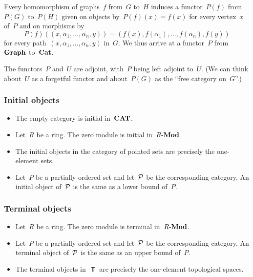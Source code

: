 \begin{itemize}
		Every homomorphism of graphs~$f$ from~$G$ to~$H$ induces a functor~$P(f)$ from~$P(G)$ to~$P(H)$ given on objects by~$P(f)(x) = f(x)$ for every vertex~$x$ of~$P$ and on morphisms by
		\[
			P(f)( (x, α_1, \dotsc, α_n, y) )
			=
			( f(x), f(α_1), \dotsc, f(α_n), f(y) )
		\]
		for every path~$(x, α_1, \dotsc, α_n, y)$ in~$G$.
		We thus arrive at a functor~$P$ from~$\mathbf{Graph}$ to~$\mathbf{Cat}$.

		The functors~$P$ and~$U$ are adjoint, with~$P$ being left adjoint to~$U$.
		(We can think about~$U$ as a forgetful functor and about~$P(G)$ as the \enquote{free category on~$G$}.)
\end{itemize}





\subsubsection*{Initial objects}

\begin{itemize}
	\item
		The empty category is initial in~$\mathbf{CAT}$.
	\item
		Let~$R$ be a ring.
		The zero module is initial in~$R\text{-}\mathbf{Mod}$.
	\item
		The initial objects in the category of pointed sets are precisely the one-element sets.
	\item
		Let~$P$ be a partially ordered set and let~$\mathcal{P}$ be the corresponding category.
		An initial object of~$\mathcal{P}$ is the same as a lower bound of~$P$.
\end{itemize}





\subsubsection*{Terminal objects}

\begin{itemize}
	\item
		Let~$R$ be a ring.
		The zero module is terminal in~$R\text{-}\mathbf{Mod}$.
	\item
		Let~$P$ be a partially ordered set and let~$\mathcal{P}$ be the corresponding category.
		An terminal object of~$\mathcal{P}$ is the same as an upper bound of~$P$.
	\item
		The terminal objects in~$\Top$ are precisely the one-element topological spaces.
\end{itemize}



